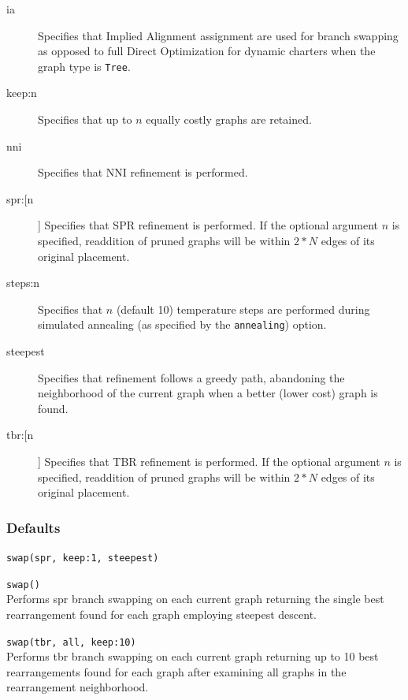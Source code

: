 \begin{description}
			\item[ia] Specifies that Implied Alignment \citep{Wheeler2003} assignment are used for 
			branch swapping as opposed to full Direct Optimization for dynamic charters when the 
			graph type is \texttt{Tree}.
		
			\item[keep:n] Specifies that up to $n$ equally costly graphs are retained.
		
			\item[nni] Specifies that NNI refinement \citep{CaminandSokal1965, Robinson1971} is performed.
		
			\item[spr:[n]] Specifies that SPR refinement \citep{Dayhoff1969} is performed. If the optional 
			argument $n$ is specified, readdition of pruned graphs will be within $2 * N$ edges of its original 
			placement.
		
			\item[steps:n] Specifies that $n$ (default 10) temperature steps are performed during simulated 
			annealing (as specified by the \texttt{annealing}) option.
		
			\item[steepest] Specifies that refinement follows a greedy path, abandoning the neighborhood 
			of the current graph when a better (lower cost) graph is found.
		
			\item[tbr:[n]] Specifies that TBR refinement \citep{Farris1988, swofford1990a} is performed. If the 
			optional argument $n$ is specified, readdition of pruned graphs will be within $2 * N$ edges of its 
			original placement.
		\end{description}	
		
		\subsubsection{Defaults}
			\texttt{swap(spr, keep:1, steepest)}
		
		\begin{example}
			\item{\texttt{swap()}\\Performs spr branch swapping on each current graph returning the single 
			best rearrangement found for each graph employing steepest descent.}
			
			\item{\texttt{swap(tbr, all, keep:10)}\\Performs tbr branch swapping on each current graph 
			returning up to 10 best rearrangements found for each graph after examining all graphs in 
			the rearrangement neighborhood.}
		\end{example}
	
